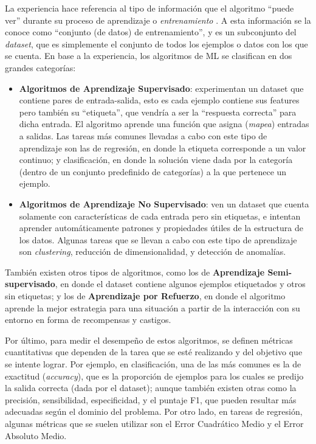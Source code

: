 \documentclass[../../main.tex]{subfiles}
\begin{document}
La experiencia hace referencia al tipo de información que el algoritmo ``puede ver''
durante su proceso de aprendizaje o \textit{entrenamiento} \cite{hands-on-ML-sklearn-tf}.
A esta información se la conoce como ``conjunto (de datos) de entrenamiento'', y es un
subconjunto del \textit{dataset}, que es simplemente el conjunto de todos los ejemplos o
datos con los que se cuenta. En base a la experiencia, los algoritmos de ML se clasifican
en dos grandes categorías:
\begin{itemize}
    \item \textbf{Algoritmos de Aprendizaje Supervisado}: experimentan un dataset que
    contiene pares de entrada-salida, esto es cada ejemplo contiene sus features pero
    también su ``etiqueta'', que vendría a ser la ``respuesta correcta'' para dicha
    entrada. El algoritmo aprende una función que asigna (\textit{mapea}) entradas a
    salidas. Las tareas más comunes llevadas a cabo con este tipo de aprendizaje son las
    de regresión, en donde la etiqueta corresponde a un valor continuo; y clasificación,
    en donde la solución viene dada por la categoría (dentro de un conjunto predefinido de
    categorías) a la que pertenece un ejemplo.
    \item \textbf{Algoritmos de Aprendizaje No Supervisado}: ven un dataset que cuenta
    solamente con características de cada entrada pero sin etiquetas, e intentan aprender
    automáticamente patrones y propiedades útiles de la estructura de los datos. Algunas
    tareas que se llevan a cabo con este tipo de aprendizaje son \textit{clustering},
    reducción de dimensionalidad, y detección de anomalías.
\end{itemize}
También existen otros tipos de algoritmos, como los de \textbf{Aprendizaje
Semi-supervisado}, en donde el dataset contiene algunos ejemplos etiquetados y otros sin
etiquetas; y los de \textbf{Aprendizaje por Refuerzo}, en donde el algoritmo aprende la
mejor estrategia para una situación a partir de la interacción con su entorno en forma de
recompensas y castigos.

Por último, para medir el desempeño de estos algoritmos, se definen métricas cuantitativas
que dependen de la tarea que se esté realizando y del objetivo que se intente lograr. Por
ejemplo, en clasificación, una de las más comunes es la de exactitud (\textit{accuracy}),
que es la proporción de ejemplos para los cuales se predijo la salida correcta (dada por
el dataset); aunque también existen otras como la precisión, sensibilidad, especificidad,
y el puntaje F1, que pueden resultar más adecuadas según el dominio del problema. Por otro
lado, en tareas de regresión, algunas métricas que se suelen utilizar son el Error
Cuadrático Medio y el Error Absoluto Medio.
\end{document}
